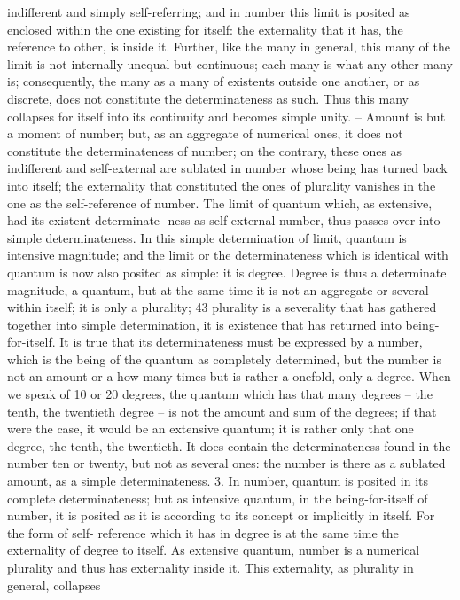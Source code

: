 indifferent and simply self-referring; and in number this limit is posited
as enclosed within the one existing for itself: the externality that it has,
the reference to other, is inside it. Further, like the many in general, this
many of the limit is not internally unequal but continuous; each many is
what any other many is; consequently, the many as a many of existents
outside one another, or as discrete, does not constitute the determinateness
as such. Thus this many collapses for itself into its continuity and becomes
simple unity. – Amount is but a moment of number; but, as an aggregate
of numerical ones, it does not constitute the determinateness of number;
on the contrary, these ones as indifferent and self-external are sublated
in number whose being has turned back into itself; the externality that
constituted the ones of plurality vanishes in the one as the self-reference of
number.
The limit of quantum which, as extensive, had its existent determinate-
ness as self-external number, thus passes over into simple determinateness.
In this simple determination of limit, quantum is intensive magnitude; and
the limit or the determinateness which is identical with quantum is now
also posited as simple: it is degree.
Degree is thus a determinate magnitude, a quantum, but at the same
time it is not an aggregate or several within itself; it is only a plurality; 43
plurality is a severality that has gathered together into simple determination,
it is existence that has returned into being-for-itself. It is true that its
determinateness must be expressed by a number, which is the being of the
quantum as completely determined, but the number is not an amount or a
how many times but is rather a onefold, only a degree. When we speak of
10 or 20 degrees, the quantum which has that many degrees – the tenth,
the twentieth degree – is not the amount and sum of the degrees; if that
were the case, it would be an extensive quantum; it is rather only that one
degree, the tenth, the twentieth. It does contain the determinateness found
in the number ten or twenty, but not as several ones: the number is there
as a sublated amount, as a simple determinateness.
3. In number, quantum is posited in its complete determinateness; but
as intensive quantum, in the being-for-itself of number, it is posited as
it is according to its concept or implicitly in itself. For the form of self-
reference which it has in degree is at the same time the externality of degree
to itself. As extensive quantum, number is a numerical plurality and thus
has externality inside it. This externality, as plurality in general, collapses
